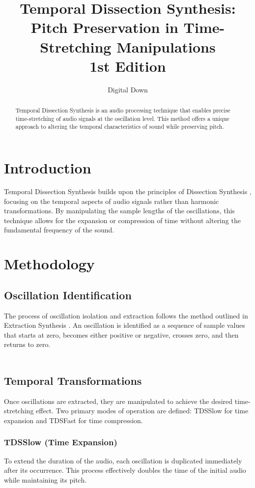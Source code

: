 \documentclass[12pt,a4paper]{article}
\title{Temporal Dissection Synthesis: Pitch Preservation in Time-Stretching Manipulations\\
\small{1st Edition}}
\author{Digital Down}
\begin{document}
\maketitle

\begin{abstract}
Temporal Dissection Synthesis is an audio processing technique that enables precise time-stretching of audio signals at the oscillation level. This method offers a unique approach to altering the temporal characteristics of sound while preserving pitch.
\end{abstract}

\section{Introduction}
Temporal Dissection Synthesis builds upon the principles of Dissection Synthesis \cite{DigitalDown2024B}, focusing on the temporal aspects of audio signals rather than harmonic transformations. By manipulating the sample lengths of the oscillations, this technique allows for the expansion or compression of time without altering the fundamental frequency of the sound.

\section{Methodology}

\subsection{Oscillation Identification}
The process of oscillation isolation and extraction follows the method outlined in Extraction Synthesis \cite{DigitalDown2024}. An oscillation is identified as a sequence of sample values that starts at zero, becomes either positive or negative, crosses zero, and then returns to zero.\\\\

\subsection{Temporal Transformations}
Once oscillations are extracted, they are manipulated to achieve the desired time-stretching effect. Two primary modes of operation are defined: TDSSlow for time expansion and TDSFast for time compression.

\subsubsection{TDSSlow (Time Expansion)}
To extend the duration of the audio, each oscillation is duplicated immediately after its occurrence. This process effectively doubles the time of the initial audio while maintaining its pitch.
\end{document}
